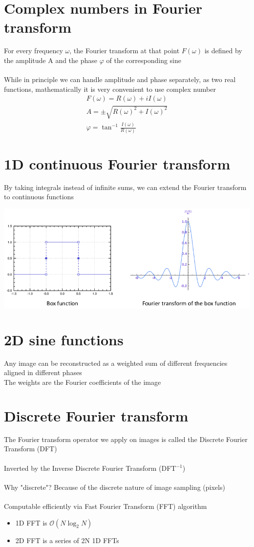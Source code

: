 \documentclass{article}[18pt]
\begin{document}
\section{Complex numbers in Fourier transform}
For every frequency $\omega$, the Fourier transform at that point $F(\omega)$ is defined by the amplitude A and the phase $\varphi$ of the corresponding sine\\
\\
While in principle we can handle amplitude and phase separately, as two real functions, mathematically it is very convenient to use complex number
\[
\begin{array}{c}{F(\omega)=R(\omega)+i I(\omega)} \\ {A=\pm \sqrt{R(\omega)^{2}+I(\omega)^{2}}} \\ {\varphi=\tan ^{-1} \frac{I(\omega)}{R(\omega)}}\end{array}
\]
\section{1D continuous Fourier transform}
By taking integrals instead of infinite sums, we can extend the Fourier transform to continuous functions
\begin{center}
	\includegraphics[scale=0.7]{"1D Continuous Fourier"}
\end{center}
\section{2D sine functions}
Any image can be reconstructed as a weighted sum of different frequencies aligned in different phases\\
The weights are the Fourier coefficients of the image
\section{Discrete Fourier transform}
The Fourier transform operator we apply on images is called the Discrete Fourier Transform (DFT)\\
\\
Inverted by the Inverse Discrete Fourier Transform (DFT$^{-1}$)\\
\\
Why "discrete"? Because of the discrete nature of image sampling (pixels)\\
\\
Computable efficiently via Fast Fourier Transform (FFT) algorithm
\begin{itemize}
	\item 1D FFT is $\mathcal{O}(N\log_2N)$
	\item 2D FFT is a series of 2N 1D FFTs
\end{itemize}
\end{document}
